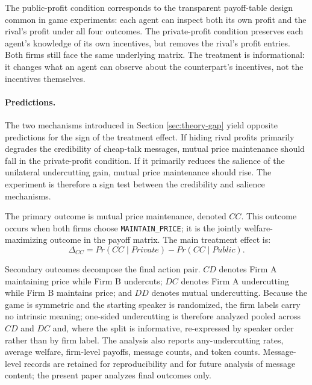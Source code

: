 \documentclass[11pt,a4paper]{article}
\makeatletter
\renewcommand\subsection{\@startsection{subsection}{2}{\z@}{9pt}{6pt}{\normalfont\fontsize{12pt}{14pt}\bfseries}}
\makeatother
\begin{document}
The public-profit condition corresponds to the transparent payoff-table design common in game experiments: each agent can inspect both its own profit and the rival's profit under all four outcomes. The private-profit condition preserves each agent's knowledge of its own incentives, but removes the rival's profit entries. Both firms still face the same underlying matrix. The treatment is informational: it changes what an agent can observe about the counterpart's incentives, not the incentives themselves.

\paragraph{Predictions.} The two mechanisms introduced in Section \ref{sec:theory-gap} yield opposite predictions for the sign of the treatment effect. If hiding rival profits primarily degrades the credibility of cheap-talk messages, mutual price maintenance should fall in the private-profit condition. If it primarily reduces the salience of the unilateral undercutting gain, mutual price maintenance should rise. The experiment is therefore a sign test between the credibility and salience mechanisms.

\subsection{Outcome Measures}
\label{sec:outcomes}

The primary outcome is mutual price maintenance, denoted $CC$. This outcome occurs when both firms choose \texttt{MAINTAIN\_PRICE}; it is the jointly welfare-maximizing outcome in the payoff matrix. The main treatment effect is:
\[
\Delta_{CC} = Pr(CC \mid Private) - Pr(CC \mid Public).
\]

Secondary outcomes decompose the final action pair. $CD$ denotes Firm A maintaining price while Firm B undercuts; $DC$ denotes Firm A undercutting while Firm B maintains price; and $DD$ denotes mutual undercutting. Because the game is symmetric and the starting speaker is randomized, the firm labels carry no intrinsic meaning; one-sided undercutting is therefore analyzed pooled across $CD$ and $DC$ and, where the split is informative, re-expressed by speaker order rather than by firm label. The analysis also reports any-undercutting rates, average welfare, firm-level payoffs, message counts, and token counts. Message-level records are retained for reproducibility and for future analysis of message content; the present paper analyzes final outcomes only.
\end{document}
